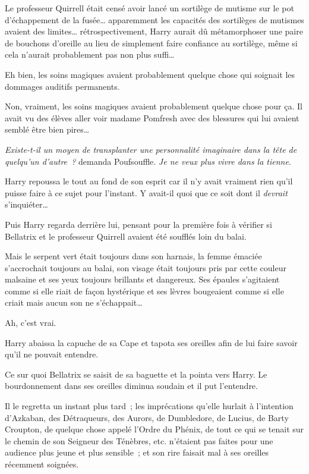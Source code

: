 Le professeur Quirrell était censé avoir lancé un sortilège de mutisme sur le pot d'échappement de la fusée… apparemment les capacités des sortilèges de mutismes avaient des limites… rétrospectivement, Harry aurait dû métamorphoser une paire de bouchons d'oreille au lieu de simplement faire confiance au sortilège, même si cela n'aurait probablement pas non plus suffi…

Eh bien, les soins magiques avaient probablement quelque chose qui soignait les dommages auditifs permanents.

Non, vraiment, les soins magiques avaient probablement quelque chose pour ça. Il avait vu des élèves aller voir madame Pomfresh avec des blessures qui lui avaient semblé être bien pires…

\emph{Existe-t-il un moyen de transplanter une personnalité imaginaire dans la tête de quelqu'un d'autre~?} demanda Poufsouffle. \emph{Je ne veux plus vivre dans la tienne}.

Harry repoussa le tout au fond de son esprit car il n'y avait vraiment rien qu'il puisse faire à ce sujet pour l'instant. Y avait-il quoi que ce soit dont il \emph{devrait} s'inquiéter…

Puis Harry regarda derrière lui, pensant pour la première fois à vérifier si Bellatrix et le professeur Quirrell avaient été soufflés loin du balai.

Mais le serpent vert était toujours dans son harnais, la femme émaciée s'accrochait toujours au balai, son visage était toujours pris par cette couleur malsaine et ses yeux toujours brillants et dangereux. Ses épaules s'agitaient comme si elle riait de façon hystérique et ses lèvres bougeaient comme si elle criait mais aucun son ne s'échappait…

Ah, c'est vrai.

Harry abaissa la capuche de sa Cape et tapota ses oreilles afin de lui faire savoir qu'il ne pouvait entendre.

Ce sur quoi Bellatrix se saisit de sa baguette et la pointa vers Harry. Le bourdonnement dans ses oreilles diminua soudain et il put l'entendre.

Il le regretta un instant plus tard~; les imprécations qu'elle hurlait à l'intention d'Azkaban, des Détraqueurs, des Aurors, de Dumbledore, de Lucius, de Barty Croupton, de quelque chose appelé l'Ordre du Phénix, de tout ce qui se tenait sur le chemin de son Seigneur des Ténèbres, etc. n'étaient pas faites pour une audience plus jeune et plus sensible~; et son rire faisait mal à ses oreilles récemment soignées.

